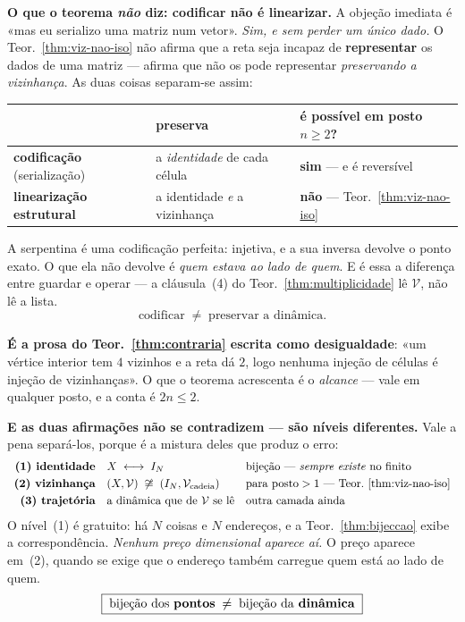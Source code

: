 \documentclass[11pt,a4paper]{article}
\begin{document}
\medskip\noindent\textbf{O que o teorema \emph{não} diz: codificar não é
linearizar.} A objeção imediata é «mas eu serializo uma matriz num vetor». \emph{Sim, e sem
perder um único dado.} O Teor.~\ref{thm:viz-nao-iso} não afirma que a reta seja
incapaz de \textbf{representar} os dados de uma matriz --- afirma que não os pode
representar \emph{preservando a vizinhança}. As duas coisas separam-se assim:
\begin{center}\small
\begin{tabular}{@{}lll@{}}
\toprule
 & preserva & é possível em posto $n\ge2$?\\
\midrule
\textbf{codificação} (serialização) & a \emph{identidade} de cada célula & \textbf{sim} --- e é reversível\\
\textbf{linearização estrutural} & a identidade \emph{e} a vizinhança & \textbf{não} --- Teor.~\ref{thm:viz-nao-iso}\\
\bottomrule
\end{tabular}
\end{center}
A serpentina é uma codificação perfeita: injetiva, e a sua inversa devolve o ponto
exato. O que ela não devolve é \emph{quem estava ao lado de quem}. E é essa a
diferença entre guardar e operar --- a cláusula~(4) do
Teor.~\ref{thm:multiplicidade} lê $\mathcal{V}$, não lê a lista.
\[
\boxed{\ \text{codificar}\;\neq\;\text{preservar a dinâmica}.\ }
\]

\medskip\noindent\textbf{É a prosa do Teor.~\ref{thm:contraria} escrita como
desigualdade}: «um vértice interior tem $4$ vizinhos e a reta dá $2$, logo nenhuma
injeção de células é injeção de vizinhanças». O que o teorema acrescenta é o
\emph{alcance} --- vale em qualquer posto, e a conta é $2n\le2$.

\medskip\noindent\textbf{E as duas afirmações não se contradizem --- são níveis
diferentes.} Vale a pena separá-los, porque é a mistura deles que produz o erro:
\[
\begin{array}{rll}
\textbf{(1) identidade} & X\;\longleftrightarrow\;I_N & \text{bijeção --- \emph{sempre existe} no finito}\\[3pt]
\textbf{(2) vizinhança} & (X,\mathcal{V})\;\not\cong\;(I_N,\mathcal{V}_{\text{cadeia}})
   & \text{para posto}>1 \text{ --- Teor.~\ref{thm:viz-nao-iso}}\\[3pt]
\textbf{(3) trajetória} & \text{a dinâmica que de }\mathcal{V}\text{ se lê} & \text{outra camada ainda}
\end{array}
\]
O nível~(1) é gratuito: há $N$ coisas e $N$ endereços, e a Teor.~\ref{thm:bijeccao}
exibe a correspondência. \emph{Nenhum preço dimensional aparece aí.} O preço aparece
em~(2), quando se exige que o endereço também carregue quem está ao lado de quem.
\[
\boxed{\;\text{bijeção dos \textbf{pontos}}\;\neq\;\text{bijeção da \textbf{dinâmica}}\;}
\]
\end{document}

